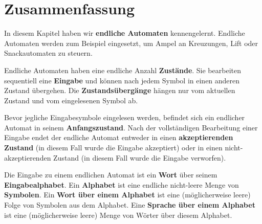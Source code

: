\documentclass{article}
\begin{document}
\section{Zusammenfassung}
In diesem Kapitel haben wir \textbf{endliche Automaten} kennengelernt. Endliche Automaten werden zum Beispiel eingesetzt, um Ampel an Kreuzungen, Lift oder Snackautomaten zu steuern.

Endliche Automaten haben eine endliche Anzahl \textbf{Zustände}. Sie bearbeiten sequentiell eine \textbf{Eingabe} und können nach jedem Symbol in einen anderen Zustand übergehen. Die \textbf{Zustandsübergänge} hängen nur vom aktuellen Zustand und vom eingelesenen Symbol ab.

Bevor jegliche Eingabesymbole eingelesen werden, befindet sich ein endlicher Automat in seinem \textbf{Anfangszustand}. Nach der vollständigen Bearbeitung einer Eingabe endet der endliche Automat entweder in einen \textbf{akzeptierenden Zustand} (in diesem Fall wurde die Eingabe akzeptiert) oder in einen nicht-akzeptierenden Zustand (in diesem Fall wurde die Eingabe verworfen).

Die Eingabe zu einem endlichen Automat ist ein \textbf{Wort} über seinem \textbf{Eingabealphabet}. Ein \textbf{Alphabet} ist eine endliche nicht-leere Menge von \textbf{Symbolen}. Ein \textbf{Wort über einem Alphabet} ist eine (möglicherweise leere) Folge von Symbolen aus dem Alphabet. Eine \textbf{Sprache über einem Alphabet} ist eine (möglicherweise leere) Menge von Wörter über diesem Alphabet.
\end{document}
